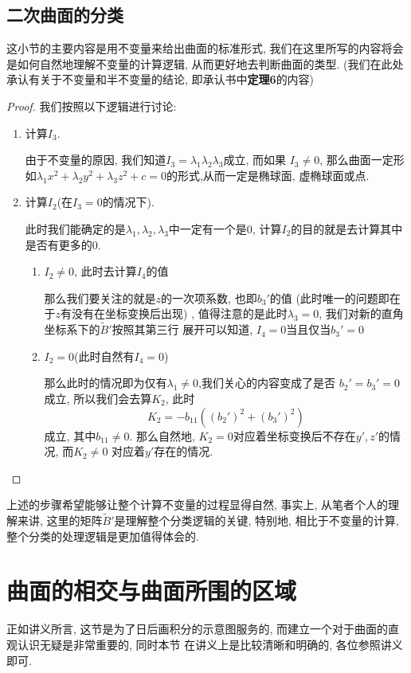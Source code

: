 \documentclass[./main.tex]{subfiles}
\begin{document}
\subsection{二次曲面的分类}
这小节的主要内容是用不变量来给出曲面的标准形式, 我们在这里所写的内容将会是如何自然地理解不变量的计算逻辑, 从而更好地去判断曲面的类型.  (我们在此处承认有关于不变量和半不变量的结论, 即承认书中\textbf{定理6}的内容) 
\begin{proof}
我们按照以下逻辑进行讨论: 
\begin{enumerate}
    \item 计算$I_3$.

    由于不变量的原因, 我们知道$I_3=\lambda_1\lambda_2\lambda_3$成立, 而如果
    $I_3\neq 0$, 那么曲面一定形如$\lambda_1x^2+\lambda_2y^2+\lambda_3z^2+c=0$的形式,从而一定是椭球面, 虚椭球面或点. 
    \item 计算$I_2$(在$I_3=0$的情况下).

    此时我们能确定的是$\lambda_1,\lambda_2,\lambda_3$中一定有一个是$0$, 
    计算$I_2$的目的就是去计算其中是否有更多的0.
    \begin{enumerate}
        \item $I_2\neq0$, 此时去计算$I_4$的值

        那么我们要关注的就是$z$的一次项系数, 也即$b_3'$的值 (此时唯一的问题即在于$z$有没有在坐标变换后出现) , 值得注意的是此时$\lambda_3=0$, 我们对新的直角坐标系下的$\tilde{B}'$按照其第三行
        展开可以知道, $I_4=0$当且仅当$b_3'=0$
        \item   $I_2=0$(此时自然有$I_4=0$)

        那么此时的情况即为仅有$\lambda_1\neq0$,我们关心的内容变成了是否
        $b_2'=b_3'=0$成立, 所以我们会去算$K_2$, 此时
        \[
        K_2=-b_{11}((b_2')^2+(b_3')^2)
        \]
        成立, 其中$b_{11}\neq0$. 那么自然地, $K_2=0$对应着坐标变换后不存在$y',z'$的情况, 而$K_2\neq0$
        对应着$y'$存在的情况.\qedhere 
\end{enumerate}
    \end{enumerate}
\end{proof}
上述的步骤希望能够让整个计算不变量的过程显得自然, 事实上, 从笔者个人的理解来讲, 这里的矩阵$\tilde{B}'$是理解整个分类逻辑的关键, 特别地, 相比于不变量的计算, 整个分类的处理逻辑是更加值得体会的. 
\section{曲面的相交与曲面所围的区域}
正如讲义所言, 这节是为了日后画积分的示意图服务的, 而建立一个对于曲面的直观认识无疑是非常重要的, 同时本节
在讲义上是比较清晰和明确的, 各位参照讲义即可. 
\end{document}
